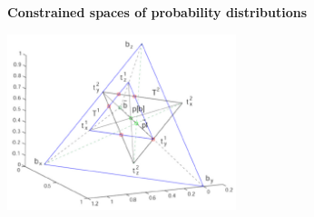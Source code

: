 \begin{frame}
\begin{block}{\textbf{Constrained spaces of probability distributions}}
\begin{center}
\includegraphics[width=0.5\textwidth]{fig/intersectingprobdists.png}
\end{center}
\end{block}
\end{frame}